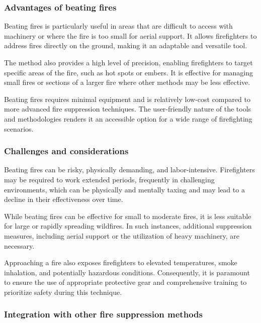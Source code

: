 \documentclass[
  12 pt,
]{Nemilov}
\begin{document}
\subsubsection{Advantages of beating fires}\label{advantages-of-beating-fires}

Beating fires is particularly useful in areas that are difficult to access with machinery or where the fire is too small for aerial support. It allows firefighters to address fires directly on the ground, making it an adaptable and versatile tool.

The method also provides a high level of precision, enabling firefighters to target specific areas of the fire, such as hot spots or embers. It is effective for managing small fires or sections of a larger fire where other methods may be less effective.

Beating fires requires minimal equipment and is relatively low-cost compared to more advanced fire suppression techniques. The user-friendly nature of the tools and methodologies renders it an accessible option for a wide range of firefighting scenarios.

\subsubsection{Challenges and considerations}\label{challenges-and-considerations-1}

Beating fires can be risky, physically demanding, and labor-intensive. Firefighters may be required to work extended periods, frequently in challenging environments, which can be physically and mentally taxing and may lead to a decline in their effectiveness over time.

While beating fires can be effective for small to moderate fires, it is less suitable for large or rapidly spreading wildfires. In such instances, additional suppression measures, including aerial support or the utilization of heavy machinery, are necessary.

Approaching a fire also exposes firefighters to elevated temperatures, smoke inhalation, and potentially hazardous conditions. Consequently, it is paramount to ensure the use of appropriate protective gear and comprehensive training to prioritize safety during this technique.

\subsubsection{Integration with other fire suppression methods}\label{integration-with-other-fire-suppression-methods}
\end{document}
